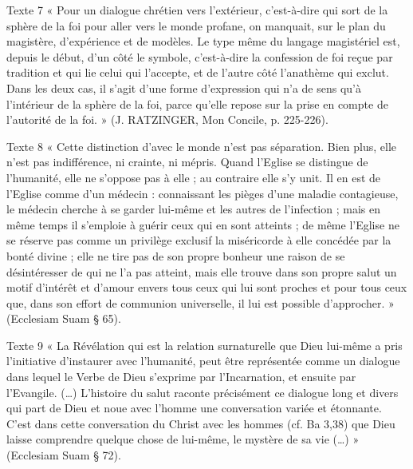 Texte  7 «  Pour  un  dialogue  chrétien  vers  l’extérieur,  c’est-à-dire  qui  sort  de  la  sphère  de  la  foi  pour aller  vers  le  monde  profane,  on  manquait,  sur  le  plan  du  magistère,  d’expérience  et  de modèles.  Le  type  même  du  langage  magistériel  est,  depuis  le  début,  d’un  côté  le  symbole, c’est-à-dire  la  confession  de  foi  reçue  par  tradition  et  qui  lie  celui  qui  l’accepte,  et  de  l’autre côté  l’anathème  qui  exclut.  Dans  les  deux  cas,  il  s’agit  d’une  forme  d’expression  qui  n’a  de sens  qu’à  l’intérieur  de  la  sphère  de  la  foi,  parce  qu’elle  repose  sur  la  prise  en  compte  de l’autorité  de  la  foi.  »  (J. RATZINGER,  Mon Concile, p. 225-226). 



Texte  8   «  Cette  distinction  d'avec  le  monde  n'est  pas  séparation.  Bien  plus,  elle  n'est  pas  indifférence, ni  crainte,  ni  mépris.  Quand  l'Eglise  se  distingue  de  l'humanité,  elle  ne  s'oppose  pas  à  elle  ;  au contraire  elle  s'y  unit.  Il  en  est  de  l'Eglise  comme  d'un  médecin  :  connaissant  les  pièges  d'une maladie  contagieuse,  le  médecin  cherche  à  se  garder  lui-même  et  les  autres  de  l'infection  ; mais  en  même  temps  il  s'emploie  à  guérir  ceux  qui  en  sont  atteints  ;  de  même  l'Eglise  ne  se réserve  pas  comme  un  privilège  exclusif  la  miséricorde  à  elle  concédée  par  la  bonté  divine  ; elle  ne  tire  pas  de  son  propre  bonheur  une  raison  de  se  désintéresser  de  qui  ne  l'a  pas  atteint, mais  elle  trouve  dans  son  propre  salut  un  motif  d'intérêt  et  d'amour  envers  tous  ceux  qui  lui sont  proches  et  pour  tous  ceux  que,  dans  son  effort  de  communion  universelle,  il  lui  est possible  d'approcher.  »  (Ecclesiam  Suam  § 65). 

Texte  9 «  La  Révélation  qui  est  la  relation  surnaturelle  que  Dieu  lui-même  a  pris  l’initiative d’instaurer  avec  l’humanité,  peut  être  représentée  comme  un  dialogue  dans  lequel  le  Verbe  de Dieu  s’exprime  par  l’Incarnation,  et  ensuite  par  l’Evangile.  (…)  L’histoire  du  salut  raconte précisément  ce  dialogue  long  et  divers  qui  part  de  Dieu  et  noue  avec  l’homme  une conversation  variée  et  étonnante.  C’est  dans  cette  conversation  du  Christ  avec  les  hommes  (cf. Ba  3,38)  que  Dieu  laisse  comprendre  quelque  chose  de  lui-même,  le  mystère  de  sa  vie  (…)  » (Ecclesiam  Suam  § 72). 


